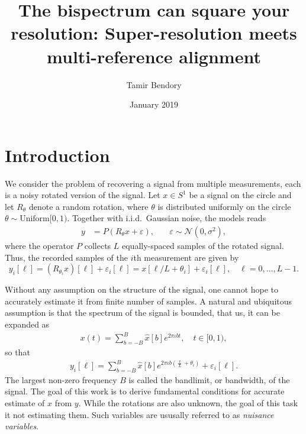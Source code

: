 \documentclass[english,12pt]{article}
\newcommand{\I}{\iota}
\newcommand{\tB}{B}
\numberwithin{equation}{section}
\numberwithin{thm}{section} %
\begin{document}
\title{The bispectrum can square your resolution: Super-resolution meets multi-reference alignment}

\author{Tamir Bendory}
\date{January 2019}
\maketitle


\section{Introduction}

We consider the problem of recovering a signal from multiple measurements, each is a noisy rotated  version of the signal. Let $x\in S^1$ be a signal on the circle and  let $R_\theta$ denote a random rotation, where $\theta$ is distributed uniformly on the circle $\theta\sim \text{Uniform}[0,1)$. Together with i.i.d.\ Gaussian noise,  the models reads
\begin{align} \label{eq:model}
y &= P(R_\theta x + \varepsilon), \quad &\varepsilon\sim \mathcal{N}(0,\sigma^2),
\end{align}
where the operator $P$ collects $L$ equally-spaced samples of the rotated signal. Thus, the recorded samples of the $i$th measurement are given by 
\begin{equation} \label{eq:continuous_measurements}
y_i[\ell] = \left(R_{\theta_i} x\right)[\ell] + \varepsilon_i[\ell] =  x[\ell/L+\theta_i] + \varepsilon_i[\ell], \quad \ell=0,\ldots,L-1.
\end{equation}

Without any assumption on the structure of the signal, one cannot hope to accurately estimate it from finite number of samples. 
A natural and ubiquitous assumption is that
the spectrum of the signal is bounded, that us,  it can  be expanded as 
\begin{eqnarray} \label{eq:fourier_expansion}
x(t) = \sum_{b=-\tB}^{\tB}\hat{x}[b]e^{2\pi\I bt }, \quad t\in[0,1),
\end{eqnarray}
so that
\begin{eqnarray} \label{eq:fourier_expansion}
y_i[\ell] = \sum_{b=-\tB}^{\tB}\hat{x}[b]e^{2\pi\I b\left(\frac{\ell}{L}+\theta_i\right) }+ \varepsilon_i[\ell].
\end{eqnarray}
The largest non-zero frequency $\tB$ is called the bandlimit, or bandwidth, of the signal.
The goal of this work is to derive  fundamental conditions for accurate estimate of $x$ from $y$. While the rotations are also unknown, the goal of this task it not estimating them. Such variables are ususally referred to as \emph{nuisance variables}.
\end{document}
